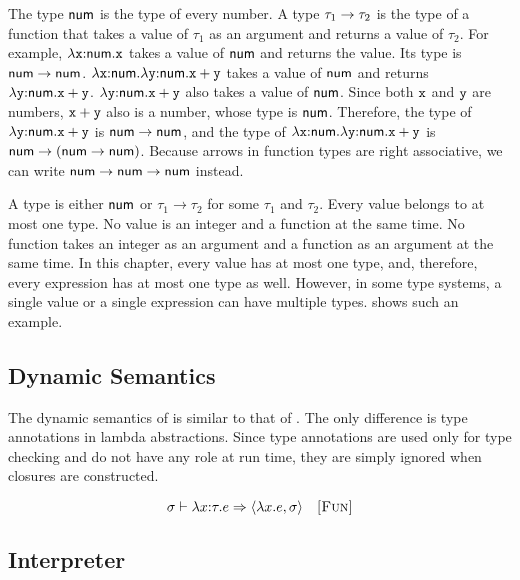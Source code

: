 The type $\textsf{num}$ is the type of every number. A type
$\tau_1\rightarrow\tau_2$ is the type of a function that takes a value of
$\tau_1$ as an argument and returns a value of $\tau_2$. For example,
$\lambda\texttt{x}{:}\textsf{num}.\texttt{x}$ takes a value of $\textsf{num}$ and returns the
value. Its type is $\textsf{num}\rightarrow\textsf{num}$.
$\lambda\texttt{x}{:}\textsf{num}.\lambda\texttt{y}{:}\textsf{num}.\texttt{x}+\texttt{y}$ takes a value of
$\textsf{num}$ and returns ${\lambda\texttt{y}{:}\textsf{num}.\texttt{x}+\texttt{y}}$.
${\lambda\texttt{y}{:}\textsf{num}.\texttt{x}+\texttt{y}}$ also takes a value of $\textsf{num}$. Since both $\texttt{x}$
and $\texttt{y}$ are numbers, $\texttt{x}+\texttt{y}$ also is a number, whose type is $\textsf{num}$.
Therefore, the type of ${\lambda\texttt{y}{:}\textsf{num}.\texttt{x}+\texttt{y}}$ is
$\textsf{num}\rightarrow\textsf{num}$, and the type of
$\lambda\texttt{x}{:}\textsf{num}.\lambda\texttt{y}{:}\textsf{num}.\texttt{x}+\texttt{y}$ is
$\textsf{num}\rightarrow(\textsf{num}\rightarrow\textsf{num})$. Because arrows in
function types are right associative, we can write
$\textsf{num}\rightarrow\textsf{num}\rightarrow\textsf{num}$ instead.

A type is either $\textsf{num}$ or $\tau_1\rightarrow\tau_2$ for some $\tau_1$
and $\tau_2$. Every value belongs to at most one type. No value is an integer and a
function at the same time. No function takes an integer as an argument and a
function as an argument at the same time. In this chapter, every value has at most
one type, and, therefore, every expression has at most one type as well. However, in some type
systems, a single value or a single expression can have multiple types.
 shows such an example.

\subsection{Dynamic Semantics}

The dynamic semantics of \lang is similar to that of \plang. The only difference is
type annotations in lambda abstractions. Since type annotations are used only
for type checking and do not have any role at run time, they are simply ignored
when closures are constructed.


\vspace{-1em}

\[
  \sigma\vdash\lambda x{:}\tau.e\Rightarrow\langle\lambda x.e,\sigma\rangle
  \quad\textsc{[Fun]}
\]

\subsection{Interpreter}

